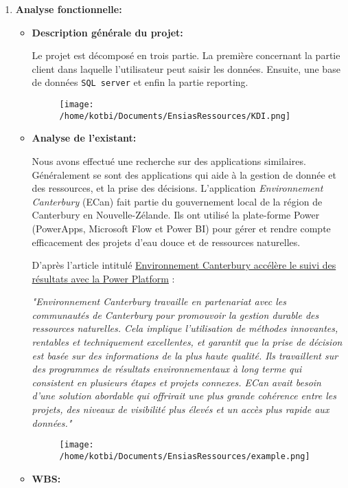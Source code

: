 \documentclass[
]{article}
\begin{document}
\begin{enumerate}
\def\labelenumi{\arabic{enumi}.}
\item
  \textbf{Analyse fonctionnelle:}

  \begin{itemize}
  \item
    \textbf{Description générale du projet:}

    Le projet est décomposé en trois partie. La première concernant la
    partie client dans laquelle l'utilisateur peut saisir les données.
    Ensuite, une base de données \texttt{SQL\ server} et enfin la partie
    reporting.

    \begin{figure}
    \centering
    \texttt{[image: /home/kotbi/Documents/EnsiasRessources/KDI.png]}
    \caption{}
    \end{figure}
  \item
    \textbf{Analyse de l'existant:}

    Nous avons effectué une recherche sur des applications similaires.
    Généralement se sont des applications qui aide à la gestion de
    donnée et des ressources, et la prise des décisions. L'application
    \emph{Environnement Canterbury} (ECan) fait partie du gouvernement
    local de la région de Canterbury en Nouvelle-Zélande. Ils ont
    utilisé la plate-forme Power (PowerApps, Microsoft Flow et Power BI)
    pour gérer et rendre compte efficacement des projets d'eau douce et
    de ressources naturelles.

    D'après l'article intitulé
    \href{https://powerapps.microsoft.com/fr-fr/blog/environment-canterbury-speeds-up-outcome-tracking-with-the-power-platform/}{Environnement
    Canterbury accélère le suivi des résultats avec la Power Platform} :

    \emph{"Environnement Canterbury travaille en partenariat avec les
    communautés de Canterbury pour promouvoir la gestion durable des
    ressources naturelles. Cela implique l'utilisation de méthodes
    innovantes, rentables et techniquement excellentes, et garantit que
    la prise de décision est basée sur des informations de la plus haute
    qualité. Ils travaillent sur des programmes de résultats
    environnementaux à long terme qui consistent en plusieurs étapes et
    projets connexes. ECan avait besoin d'une solution abordable qui
    offrirait une plus grande cohérence entre les projets, des niveaux
    de visibilité plus élevés et un accès plus rapide aux données."}

    \begin{figure}
    \centering
    \texttt{[image: /home/kotbi/Documents/EnsiasRessources/example.png]}
    \caption{}
    \end{figure}
  \item
    \textbf{WBS:}


\end{itemize}
\end{enumerate}
\end{document}
